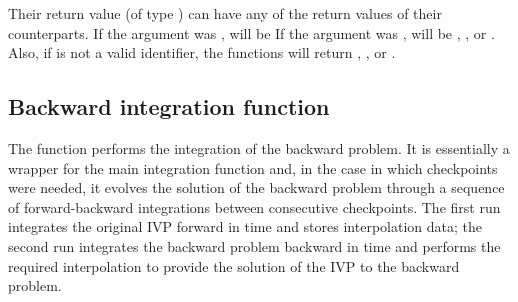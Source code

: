 Their return value  (of type ) can have any of the return values 
of their counterparts.
If the  argument was ,  will be
If the  argument was , 
 will be , , or . 
Also, if  is not a valid identifier, the functions will return 
, , or .


\subsection{Backward integration function}
\label{sss:cvsolveb}

The function  performs the integration of the backward problem.
It is essentially a wrapper for the {\cvodes} main integration function 
 and, in the case in which checkpoints were needed, it evolves 
the solution of the backward problem through a sequence of forward-backward 
integrations between consecutive checkpoints. 
The first run integrates the original IVP forward in time and
stores interpolation data; the second run integrates the backward problem 
backward in time and performs the required interpolation to provide
the solution of the IVP to the backward problem.

